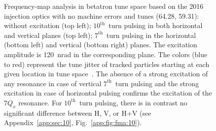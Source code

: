 \documentclass[%
 reprint,
 amsmath,amssymb,
 aps,
prstab,
longbibliography
]{revtex4-1}
\begin{document}
\begin{figure}
\begin{tabular}{cc}
  \end{tabular}
  \caption{Frequency-map analysis in betatron tune space based on the
    2016 injection optics with no machine errors and tunes (64.28,
    59.31): without excitation (top left); $10^{\mathrm{th}}$~turn
    pulsing in both horizontal and vertical planes (top left);
    $7^{\mathrm{th}}$~turn pulsing in the horizontal (bottom left) and
    vertical (bottom right) planes. The excitation amplitude is
    120~nrad in the corresponding plane. The colors (blue to red)
    represent the tune jitter of tracked particles starting at each
    given location in tune space~\cite{fmalaskar}. The absence of a
    strong excitation of any resonance in case of vertical
    $7^{\mathrm{th}}$~turn pulsing and the strong excitation in case
    of horizontal pulsing confirms the excitation of the $7 Q_x$
    resonance. For $10^{\mathrm{th}}$~turn pulsing, there is in
    contrast no significant difference between H, V, or H+V (see
    Appendix~\ref{app:sec:10}, Fig.~\ref{app:fig:fma:10}).}
  \label{fig:patternfma}
\end{figure}
\end{document}

